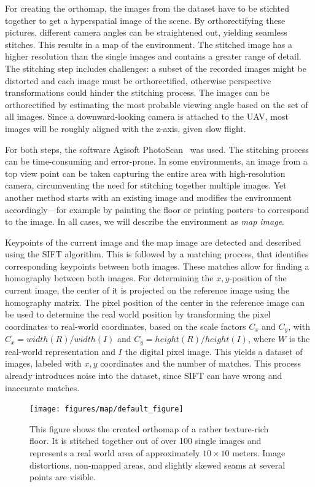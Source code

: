 For creating the orthomap, the images from the dataset have to be stichted
together to get a hyperspatial image of the scene. By orthorectifying
these pictures, different camera angles can be straightened out,
yielding seamless stitches. This results in a map of the
environment. The stitched image has a higher resolution than the
single images and contains a greater range of detail. The stitching
step includes challenges: a subset of the recorded images might be
distorted and each image must be orthorectified, otherwise perspective
transformations could hinder the stitching process. The images can be
orthorectified by estimating the most probable viewing angle based on
the set of all images. Since a downward-looking camera is attached to
the UAV, most images will be roughly aligned with the z-axis, given
slow flight.

For both steps, the software Agisoft
PhotoScan~\cite{agisoft2013agisoft} was used. The stitching process
can be time-consuming and error-prone. In some environments, an image
from a top view point can be taken capturing the entire area with
high-resolution camera, circumventing the need for stitching together
multiple images. Yet another method starts with an existing image and
modifies the environment accordingly---for example by painting the
floor or printing posters--to correspond to the image. In all cases,
we will describe the environment as \emph{map image}. 

Keypoints of the current image and the map image are detected and
described using the SIFT algorithm. This is followed by a matching
process, that identifies corresponding keypoints between both
images. These matches allow for finding a homography between both
images. For determining the $x, y$-position of the current image, the
center of it is projected on the reference image using the homography
matrix. The pixel position of the center in the reference image can be
used to determine the real world position by transforming the pixel
coordinates to real-world coordinates, based on the scale factors
$C_x$ and $C_y$, with $C_x = width(R) / width(I)$ and
$C_y = height(R) / height(I)$, where $W$ is the real-world
representation and $I$ the digital pixel image. This yields a dataset
of images, labeled with $x, y$ coordinates and the number of
matches. This process already introduces noise into the dataset, since
SIFT can have wrong and inaccurate matches.

\begin{figure}[h!]
\begin{center}
\texttt{[image: figures/map/default\_figure]}
\caption{{\label{fig:orthomap} This figure shows
    the created orthomap of a rather texture-rich floor. It is
    stitched together out of over 100 single images and represents a
    real world area of approximately $10\times10$ meters. Image
    distortions, non-mapped areas, and slightly skewed seams at
    several points are visible.%
}}
\end{center}
\end{figure}


